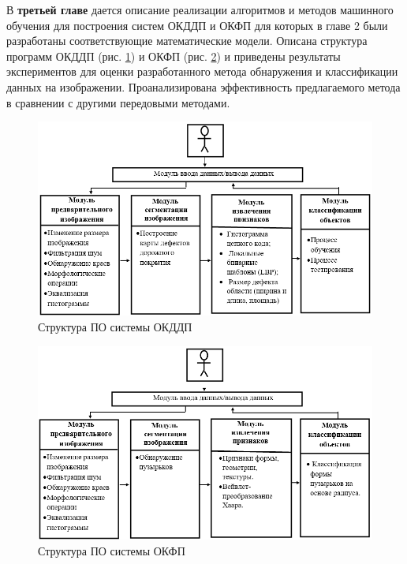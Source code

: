 В \textbf {третьей главе} дается описание реализации алгоритмов и методов машинного обучения для построения систем ОКДДП и ОКФП для которых в главе 2 были разработаны соответствующие математические модели. Описана структура программ ОКДДП (рис. \ref{pic47}) и ОКФП (рис. \ref{pic59}) и приведены результаты экспериментов для оценки разработанного метода обнаружения и классификации данных на изображении. Проанализирована эффективность предлагаемого метода в сравнении с другими передовыми методами. 
\begin{figure}[ht!]
\centering
\vspace{-0.8em}
\includegraphics [width=1\linewidth]{images/pic47.png}
\caption{Структура ПО системы ОКДДП} \label{pic47}
\end{figure}

\begin{figure}[ht!]
\centering
\vspace{-0.8em}
\includegraphics [width=1\linewidth]{images/pic59.png}
\caption{Структура ПО системы ОКФП} \label{pic59}
\end{figure}

